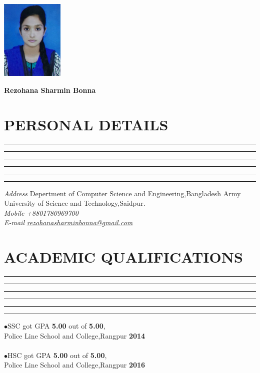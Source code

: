 \documentclass{article}
\begin{document}
	
\begin{flushright}
	\includegraphics[width=3cm]{bua}	
\end{flushright}

	\begin{flushright}
	\textbf{\huge Rezohana Sharmin Bonna}
	\end{flushright}


\section*{\color{green}PERSONAL DETAILS}
\hrule \hrule \hrule \hrule \hrule \hrule
\vspace{0.4cm}
\textit{Address}\hspace{0.5cm} Depertment of Computer Science and Engineering,Bangladesh Army
\hspace*{1.8cm}University of Science and Technology,Saidpur.\\
\textit{Mobile}\hspace{0.6cm} \textit{+8801780969700}\\
\textit{E-mail}\hspace{0.6cm} \href{{mailto:rezohanasharminbonna@gmail.com}}{\underline{\textit{\color{blue}rezohanasharminbonna@gmail.com}}}
\section*{\color{green}ACADEMIC QUALIFICATIONS }	
\hrule \hrule \hrule \hrule \hrule \hrule
\vspace{0.4cm}
$\bullet $\hspace{0.2cm}SSC got GPA \textbf{5.00} out of \textbf{5.00},\\                                                                                                                   \hspace*{0.4cm}Police Line School and College,Rangpur \textbf{2014}\\
\\
$\bullet $\hspace{0.2cm}HSC got GPA \textbf{5.00} out of \textbf{5.00},\\                                                                                                                       \hspace*{0.4cm}Police Line School and College,Rangpur \textbf{2016}
\end{document}
